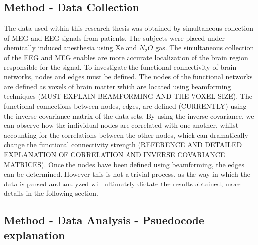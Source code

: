 \documentclass{article}
\begin{document}
\subsection{Method - Data Collection}
The data used within this research thesis was obtained  by simultaneous collection of MEG and EEG signals from patients. The subjects were placed under chemically induced anesthesia using Xe and $N_2 O$ gas. The simultaneous collection of the EEG and MEG enables are more accurate localization of the brain region responsible for the signal. To investigate the functional connectivity of brain networks, nodes and edges must be defined. The nodes of the functional networks are defined as voxels of brain matter which are located using beamforming techniques (MUST EXPLAIN BEAMFORMING AND THE VOXEL SIZE). The functional connections between nodes, edges, are defined (CURRENTLY) using the inverse covariance matrix of the data sets. By using the inverse covariance, we can observe how the individual nodes are correlated with one another, whilst accounting for the correlations between the other nodes, which can dramatically change the functional connectivity strength (REFERENCE AND DETAILED EXPLANATION OF CORRELATION AND INVERSE COVARIANCE MATRICES). Once the nodes have been defined using beamforming, the edges can be determined. However this is not a trivial process, as the way in which the data is parsed and analyzed will ultimately dictate the results obtained, more details in the following section.

\subsection{Method - Data Analysis - Psuedocode explanation}
\end{document}
